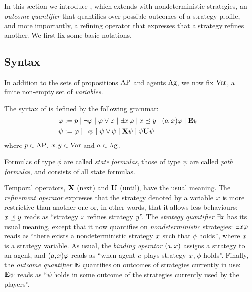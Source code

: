 
In this section we introduce \SLref, which extends \SL 
with nondeterministic strategies,  an \emph{outcome quantifier} that
quantifies over possible outcomes of a strategy profile,
and more importantly, a refining operator that expresses that a
strategy refines another.
We first fix some basic notations.



 \subsection{Syntax}
 \label{sec-SL-definition}

In addition to the sets of propositions $\textnormal{AP}$ and agents $\textnormal{Ag}$, we
now fix $\textnormal{Var}$, a finite non-empty set of \emph{variables}.



\begin{definition}%
  \label{def-SLi}
    The syntax of \SLref is defined by the following grammar:
    \begin{align*}
  \varphi:= &\; p 
  \mid \neg \varphi 
  \mid \varphi\vee\varphi 
               \mid \exists x\, \varphi
               \mid x \preceq y
               \mid (a,x)\varphi
  \mid {\bf E}\psi               
      \\
      \psi:= &\; \varphi
                   \mid \neg \psi
                   \mid \psi\vee \psi
                   \mid {\bf X} \psi
                   \mid  \psi {\bf U} \psi
    \end{align*}
     where 
  $p\in\textnormal{AP}$, $x,y\in\textnormal{Var}$ and $a\in\textnormal{Ag}$.
\end{definition}

Formulas of type $\phi$ are called \emph{state formulas}, those of type $\psi$
are called \emph{path formulas}, and \SLref consists of all state formulas.


Temporal operators, ${\bf X}$ (next) and
 ${\bf U}$ (until), have the usual meaning. The \emph{refinement
   operator} expresses that the strategy denoted by a variable $x$ is more
 restrictive than another one or, in other words, that it allows less behaviours: $x\preceq y$ reads as ``strategy
 $x$ refines strategy $y$''. The  \emph{strategy
   quantifier}  $\exists x$  has its usual meaning, except that it now
 quantifies on \emph{nondeterministic}
 strategies: $\exists x\varphi$
 reads as ``there exists a nondeterministic
 strategy $x$
  such that $\phi$
 holds'', where $x$ is a strategy variable. 
As usual, the \emph{binding operator} $(a,x)$ assigns a strategy to an
 agent, and $(a,x)\varphi$ reads as ``when agent $a$ plays strategy $x$,
 $\phi$ holds''.
Finally, the \emph{outcome quantifier} ${\bf E}$ quantifies on
   outcomes of strategies currently in use: ${\bf E}\psi$ reads as ``$\psi$
 holds in some
 outcome of the strategies currently used by the players''.


